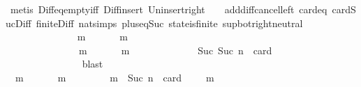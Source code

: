 \begin{isabellebody}
\ {\isacharparenleft}metis\ Diff{\isacharunderscore}eq{\isacharunderscore}empty{\isacharunderscore}iff\ Diff{\isacharunderscore}insert\ Un{\isacharunderscore}insert{\isacharunderscore}right\ {\isacartoucheopen}{\isasymsigma}\ {\isasymin}\ {\isasymSigma}{\isacartoucheclose}\ add{\isacharunderscore}diff{\isacharunderscore}cancel{\isacharunderscore}left{\isacharprime}\ card{\isacharunderscore}{}{\isacharunderscore}eq\ card{\isacharunderscore}Suc{\isacharunderscore}Diff{}\ finite{\isacharunderscore}Diff\ nat{\isachardot}simps{\isacharparenleft}{}{\isacharparenright}\ plus{\isacharunderscore}{}{\isacharunderscore}eq{\isacharunderscore}Suc\ state{\isacharunderscore}is{\isacharunderscore}finite\ sup{\isacharunderscore}bot{\isachardot}right{\isacharunderscore}neutral{\isacharparenright}\isanewline
\ \ \ \ \ \ \ \ \ \ \ \ \isamarkupfalse%
\ {\isachardoublequoteopen}{\isasymexists}\ m\ {\isasymin}\ {\isasymsigma}\ {\isacharminus}\ {\isasymsigma}{\isacharprime}{\isachardot}\ {\isasymsigma}{\isacharprime}\ {\isasymunion}\ {\isacharbraceleft}m{\isacharbraceright}\ {\isasymin}\ {\isasymSigma}{\isachardoublequoteclose}\isanewline
\ \ \ \ \ \ \ \ \ \ \ \ \ \ \isamarkupfalse%
\ {\isacartoucheopen}{\isasymforall}\ {\isasymsigma}\ {\isasymin}\ {\isasymSigma}{\isachardot}\ {\isasymforall}\ {\isasymsigma}{\isacharprime}\ {\isasymin}\ {\isasymSigma}{\isachardot}\ {\isasymnot}\ {\isasymsigma}\ {\isasymsubseteq}\ {\isasymsigma}{\isacharprime}\ {\isasymlongrightarrow}\ {\isacharparenleft}{\isasymexists}\ m\ {\isasymin}\ {\isasymsigma}\ {\isacharminus}\ {\isasymsigma}{\isacharprime}{\isachardot}\ {\isasymsigma}{\isacharprime}\ {\isasymunion}\ {\isacharbraceleft}m{\isacharbraceright}\ {\isasymin}\ {\isasymSigma}{\isacharparenright}{\isacartoucheclose}\ {\isacartoucheopen}{\isasymsigma}\ {\isasymin}\ {\isasymSigma}{\isacartoucheclose}\ {\isacartoucheopen}{\isasymsigma}{\isacharprime}\ {\isasymin}\ {\isasymSigma}{\isacartoucheclose}\ {\isacartoucheopen}{\isasymnot}\ {\isasymsigma}\ {\isasymsubseteq}\ {\isasymsigma}{\isacharprime}\ {\isasymand}\ Suc\ {\isacharparenleft}Suc\ n{\isacharparenright}\ {\isacharequal}\ card\ {\isacharparenleft}{\isasymsigma}\ {\isacharminus}\ {\isasymsigma}{\isacharprime}{\isacharparenright}{\isacartoucheclose}\isanewline
\ \ \ \ \ \ \ \ \ \ \ \ \ \ \isamarkupfalse%
\ blast\isanewline
\ \ \ \ \ \ \ \ \ \ \ \ \isamarkupfalse%
\ \isamarkupfalse%
\ {\isachardoublequoteopen}{\isasymexists}\ m\ {\isasymin}\ {\isasymsigma}\ {\isacharminus}\ {\isasymsigma}{\isacharprime}{\isachardot}\ {\isasymsigma}{\isacharprime}\ {\isasymunion}\ {\isacharbraceleft}m{\isacharbraceright}\ {\isasymin}\ {\isasymSigma}\ {\isasymand}\ {\isasymnot}\ {\isasymsigma}\ {\isasymsubseteq}\ {\isasymsigma}{\isacharprime}\ {\isasymunion}\ {\isacharbraceleft}m{\isacharbraceright}\ {\isasymand}\ Suc\ n\ {\isacharequal}\ card\ {\isacharparenleft}{\isasymsigma}\ {\isacharminus}\ {\isacharparenleft}{\isasymsigma}{\isacharprime}\ {\isasymunion}\ {\isacharbraceleft}m{\isacharbraceright}{\isacharparenright}{\isacharparenright}{\isachardoublequoteclose}\isanewline

\end{isabellebody}

